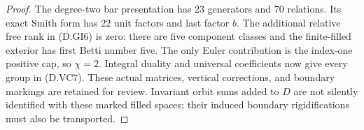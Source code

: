 \begin{proof}
The degree-two bar presentation has $23$ generators and $70$
relations. Its exact Smith form has $22$ unit factors and last
factor $b$. The additional relative free rank in (D.GI6) is zero:
there are five component classes and the finite-filled exterior
has first Betti number five. The only Euler contribution is the
index-one positive cap, so $\chi=2$. Integral duality and universal
coefficients now give every group in (D.VC7).
These actual matrices, vertical corrections, and boundary markings
are retained for review. Invariant orbit sums added to $D$ are not
silently identified with these marked filled spaces; their induced
boundary rigidifications must also be transported.
\end{proof}
